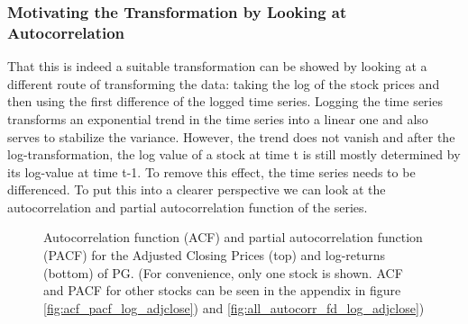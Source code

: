\subsubsection{Motivating the Transformation by Looking at Autocorrelation}
That this is indeed a suitable transformation can be showed by looking at a different route of transforming the data: taking the log of the stock prices and then using the first difference of the logged time series. Logging the time series transforms an exponential trend in the time series into a linear one and also serves to stabilize the variance. However, the trend does not vanish and after the log-transformation, the log value of a stock at time t is still mostly determined by its log-value at time t-1. To remove this effect, the time series needs to be differenced. To put this into a clearer perspective we can look at the autocorrelation and partial autocorrelation function of the series. 

\begin{figure}[h!]
    \centering
    \begin{adjustbox}{width=.95\textwidth,center}
    
    \end{adjustbox}  
    \hspace{3ex}
    \begin{adjustbox}{width=.95\textwidth,center}
    
    \end{adjustbox}
    \caption{Autocorrelation function (ACF) and partial autocorrelation function (PACF) for the Adjusted Closing Prices (top) and log-returns (bottom) of PG. (For convenience, only one stock is shown. ACF and PACF for other stocks can be seen in the appendix in figure \ref{fig:acf_pacf_log_adjclose}) and  \ref{fig:all_autocorr_fd_log_adjclose})}
    \label{fig:acf_pacf_log_adjclose_PG}
\end{figure}{}

